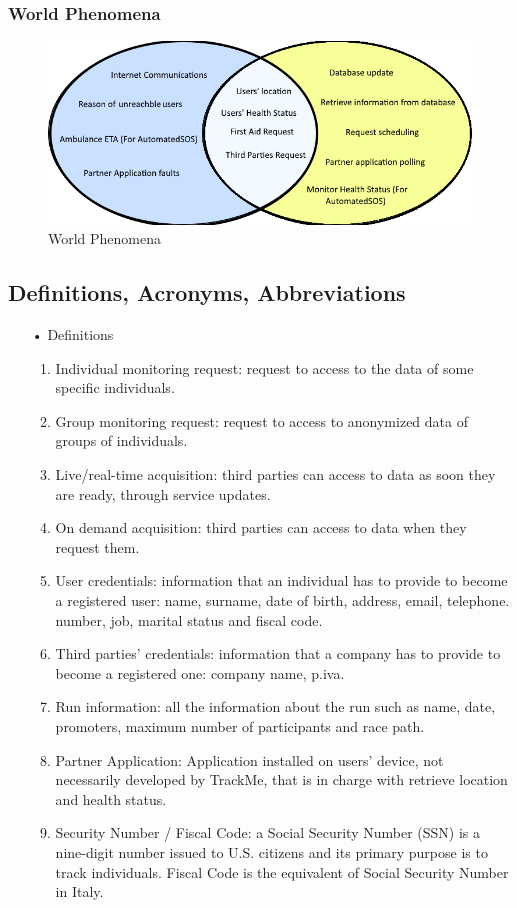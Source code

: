 \subsubsection{World Phenomena}
\begin{figure}[H]
\includegraphics[scale=0.8]{Images/WordPhen.png}
\caption{World Phenomena}
\end{figure}

\subsection{Definitions, Acronyms, Abbreviations}

\begin{enumerate}
\item[•] {\Large Definitions}
	\begin{enumerate}
		\item Individual monitoring request: request to access to the data of some specific  individuals.
		\item Group monitoring request: request to access to anonymized data of groups of individuals.
		\item Live/real-time acquisition: third parties can access to data as soon they are ready, 				through service updates.
		\item On demand acquisition: third parties can access to data when they request 				them.
		\item User credentials: information that an individual has to provide to become a 				registered user: name, surname, date of birth, address, email, telephone.
			number, job, marital status and fiscal code. 
		\item Third parties' credentials: information that a company has to provide to 					become a registered one: company name, p.iva.
		\item Run information: all the information about the run such as name, date, promoters, 				maximum number of participants and race path.
		\item Partner Application: Application installed on users' device, not necessarily developed by TrackMe, that is in charge with retrieve location and health status. 
		\item Security Number / Fiscal Code: a Social Security Number (SSN) is a nine-digit number issued to U.S. citizens and its primary purpose is to track individuals. Fiscal Code is the equivalent of Social Security Number in Italy.
	\end{enumerate}
\end{enumerate}

